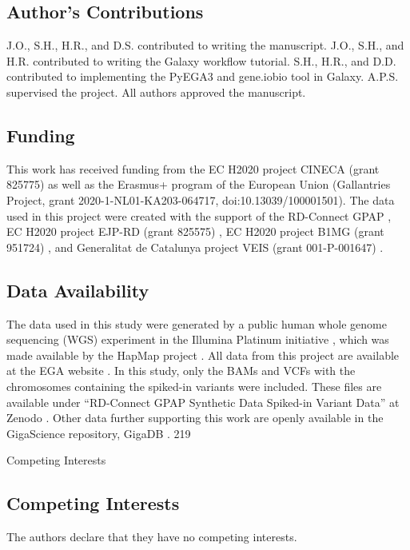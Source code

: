 \subsection*{Author's Contributions}
J.O., S.H., H.R., and D.S. contributed to writing the manuscript. J.O., S.H., and H.R. contributed to writing the Galaxy workflow tutorial. S.H., H.R., and D.D. contributed to implementing the PyEGA3 and gene.iobio tool in Galaxy. A.P.S. supervised the project. All authors approved the manuscript.

\subsection*{Funding}
This work has received funding from the EC H2020 project CINECA (grant 825775) \cite{CINECA} as well as the Erasmus+ program of the European Union (Gallantries Project, grant 2020-1-NL01-KA203-064717, doi:10.13039/100001501). The data used in this project were created with the support of the RD-Connect GPAP \cite{RD_connect_GPAP}, EC H2020 project EJP-RD (grant 825575) \cite{EJP-RD}, EC H2020 project B1MG (grant 951724) \cite{B1MG_grant}, and Generalitat de Catalunya project VEIS (grant 001-P-001647) \cite{VEIS}.

\subsection*{Data Availability}
The data used in this study were generated by a public human whole genome sequencing (WGS) experiment in the Illumina Platinum initiative \cite{Eberle}, which was made available by the HapMap project \cite{HapMap}. All data from this project are available at the EGA website \cite{EGA}. In this study, only the BAMs and VCFs with the chromosomes containing the spiked-in variants were included. These files are available under ``RD-Connect GPAP Synthetic Data Spiked-in Variant Data'' at Zenodo \cite{zenodo}. Other data further supporting this work are openly available in the GigaScience repository, GigaDB \cite{gigadb}.
 219

Competing Interests

\subsection*{Competing Interests}
The authors declare that they have no competing interests.


\footnotesize


\normalsize
